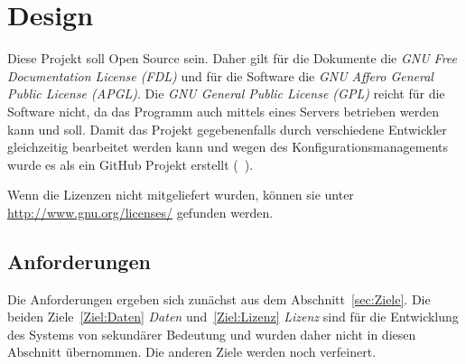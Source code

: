 \documentclass[english,ngerman,parskip=half,headsepline,footsepline]{scrreprt}
\begin{document}

	\chapter{Design} %

	\thispagestyle{scrheadings}

	Diese Projekt soll Open Source sein. Daher gilt für die Dokumente die \emph{GNU Free Documentation License (FDL)} und für die Software die \emph{GNU Affero General Public License (APGL)}. Die \emph{GNU General Public License (GPL)} reicht für die Software nicht, da das Programm auch mittels eines Servers betrieben werden kann und soll. Damit das Projekt gegebenenfalls durch verschiedene Entwickler gleichzeitig bearbeitet werden kann und wegen des Konfigurationsmanagements wurde es als ein GitHub Projekt erstellt (\seename~\cite{bib:ASBA}).

	Wenn die Lizenzen nicht mitgeliefert wurden, können sie unter \url{http://www.gnu.org/licenses/} gefunden werden.

	\section{Anforderungen}
	\label{Anforderungen}

	Die Anforderungen ergeben sich zunächst aus dem Abschnitt~\vref{sec:Ziele}. Die beiden Ziele~\ref{Ziel:Daten} \emph{Daten} und~\ref{Ziel:Lizenz} \emph{Lizenz} sind für die Entwicklung des Systems von sekundärer Bedeutung und wurden daher nicht in diesen Abschnitt übernommen. Die anderen Ziele werden noch verfeinert.
\end{document}
